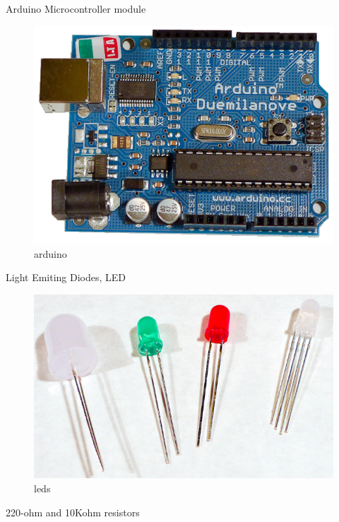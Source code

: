 Arduino Microcontroller module

\begin{figure}[!htb]
 \centering
 \includegraphics[scale=0.3]{img/analogio/arduino.png}
 \caption{arduino}
 \label{arduino}
\end{figure}

Light Emiting Diodes, LED


\begin{figure}[!htb]
 \centering
 \includegraphics[scale=0.3]{img/analogio/leds.jpg}
 \caption{leds}
 \label{leds}
\end{figure}

220-ohm and 10Kohm resistors


